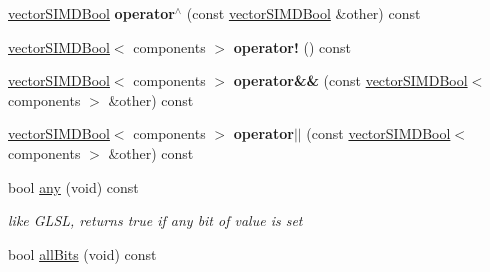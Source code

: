 \begin{DoxyCompactItemize}
\item 
\hyperlink{classirr_1_1core_1_1vectorSIMDBool}{vector\+S\+I\+M\+D\+Bool} {\bfseries operator$^\wedge$} (const \hyperlink{classirr_1_1core_1_1vectorSIMDBool}{vector\+S\+I\+M\+D\+Bool} \&other) const \hypertarget{classirr_1_1core_1_1vectorSIMDBool_a2c14d7112da1098c5f959d699f9b0243}{}\label{classirr_1_1core_1_1vectorSIMDBool_a2c14d7112da1098c5f959d699f9b0243}

\item 
\hyperlink{classirr_1_1core_1_1vectorSIMDBool}{vector\+S\+I\+M\+D\+Bool}$<$ components $>$ {\bfseries operator!} () const \hypertarget{classirr_1_1core_1_1vectorSIMDBool_af1d9151617fb0321306f88ed13fb02b2}{}\label{classirr_1_1core_1_1vectorSIMDBool_af1d9151617fb0321306f88ed13fb02b2}

\item 
\hyperlink{classirr_1_1core_1_1vectorSIMDBool}{vector\+S\+I\+M\+D\+Bool}$<$ components $>$ {\bfseries operator\&\&} (const \hyperlink{classirr_1_1core_1_1vectorSIMDBool}{vector\+S\+I\+M\+D\+Bool}$<$ components $>$ \&other) const \hypertarget{classirr_1_1core_1_1vectorSIMDBool_ae5d105ce29426b11e8e57be7cfa18646}{}\label{classirr_1_1core_1_1vectorSIMDBool_ae5d105ce29426b11e8e57be7cfa18646}

\item 
\hyperlink{classirr_1_1core_1_1vectorSIMDBool}{vector\+S\+I\+M\+D\+Bool}$<$ components $>$ {\bfseries operator$\vert$$\vert$} (const \hyperlink{classirr_1_1core_1_1vectorSIMDBool}{vector\+S\+I\+M\+D\+Bool}$<$ components $>$ \&other) const \hypertarget{classirr_1_1core_1_1vectorSIMDBool_a5b2f994a6560fc6da2447bb74866b968}{}\label{classirr_1_1core_1_1vectorSIMDBool_a5b2f994a6560fc6da2447bb74866b968}

\item 
bool \hyperlink{classirr_1_1core_1_1vectorSIMDBool_abe9f1569b7b3eff1c08f3690d13f0644}{any} (void) const \hypertarget{classirr_1_1core_1_1vectorSIMDBool_abe9f1569b7b3eff1c08f3690d13f0644}{}\label{classirr_1_1core_1_1vectorSIMDBool_abe9f1569b7b3eff1c08f3690d13f0644}

\begin{DoxyCompactList}\small\item\em like G\+L\+SL, returns true if any bit of value is set \end{DoxyCompactList}\item 
bool \hyperlink{classirr_1_1core_1_1vectorSIMDBool_a59e5904e6027913b28819836c4fbfd3a}{all\+Bits} (void) const \hypertarget{classirr_1_1core_1_1vectorSIMDBool_a59e5904e6027913b28819836c4fbfd3a}{}\label{classirr_1_1core_1_1vectorSIMDBool_a59e5904e6027913b28819836c4fbfd3a}


\end{DoxyCompactItemize}
